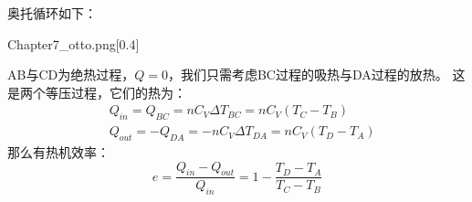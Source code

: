 \documentclass{Physics_H_Notes}
\begin{document}
        \begin{prove}
            奥托循环如下：
            \begin{singlefigure}{Chapter7_otto.png}[0.4]
            \end{singlefigure}
            AB与CD为绝热过程，$Q = 0$，我们只需考虑BC过程的吸热与DA过程的放热。
            这是两个等压过程，它们的热为：
            \begin{equation}
                \begin{aligned}
                    &Q_{in} = Q_{BC} = nC_{V}\Delta T_{BC}= nC_{V}(T_{C} - T_{B})\\
                    &Q_{out} = -Q_{DA} = -nC_{V}\Delta T_{DA}= nC_{V}(T_{D} - T_{A})
                \end{aligned}
                \nonumber
            \end{equation}
            那么有热机效率：
            \begin{equation}
                e = \frac{Q_{in}-Q_{out}}{Q_{in}} = 1 - \frac{T_{D} - T_{A}}{T_{C} - T_{B}}
            \end{equation}
        \end{prove}
\end{document}
